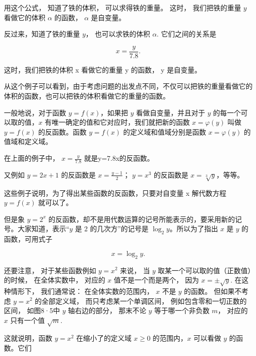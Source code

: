 用这个公式， 知道了铁的体积， 可以求得铁的重量。 这时， 我们把铁的重量
\(y\) 看做它的体积 \(\alpha\) 的函数， \(\alpha\) 是自变量。

反过来，知道了铁的重量 \(y\)， 也可以求铁的体积 \(\alpha\).
它们之间的关系是

\[
x = \frac {y}{7.8}.
\]

这时，我们把铁的体积 x 看做它的重量 y 的函数， y 是自变量。

从这个例子可以看到，由于考虑问题的出发点不同，不仅可以把铁的重量看做它的体积的函数，也可以把铁的体积看做它的重量的函数。

一般地说，对于函数 \(y = f(x)\)，如果把 \(y\) 看做自变量，并且对于 \(y\)
的每一个可以取的值，\(x\) 有唯一确定的值和它对应时，我们就把新的函数
\(x = \varphi(y)\) 叫做 \(y = f(x)\) 的反函数。函数 \(y = f(x)\)
的定义域和值域分别是函数 \(x = \varphi(y)\) 的值域和定义域。

在上面的例子中， \(x=\frac{y}{7.8}\) 就是y=7.8x的反函数。

又例如 \(y = 2x + 1\) 的反函数是 \(x = \frac{y - 1}{2}\)； \(y = x^3\)
的反函数是 \(x = \sqrt[3]{y}\)，等等。

这些例子说明，为了得出某些函数的反函数，只要对自变量 x 解代数方程
\(y=f(x)\) 就可以了。

但是象 \(y = 2^x\)
的反函数，却不是用代数运算的记号所能表示的，要采用新的记号。大家知道，表示``\(y\)
是 2 的几次方''的记号是 \(\log_2 y\)。所以为了指出 \(x\) 是 \(y\)
的函数，可用式子

\[
x = \log_ {2} y.
\]

还要注意， 对于某些函数例如 \(y = x^2\) 来说， 当 \(y\)
取某一个可以取的值（正数值）的时候， 在全体实数中， 对应的 \(x\)
值不是一个而是两个， 因为 \(x = \pm \sqrt{y}\). 在这种情形下，
我们通常说： 在全体实数的范围内， \(x\) 不是 \(y\) 的函数。 但如果不考虑
\(y = x^2\) 的全部定义域， 而只考虑某一个单调区间，
例如包含零和一切正数的区间， 如图8·5中 \(y\) 轴右边的部分， 那末不论
\(y\) 等于哪一个非负数 \(m\)， 对应的 \(x\) 只有一个值 \(\sqrt{m}\).

这就说明，函数 \(y = x^2\) 在缩小了的定义域 \(x \geqslant 0\)
的范围内，\(x\) 可以看做 \(y\) 的函数。它们

